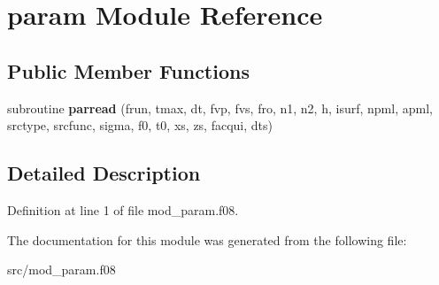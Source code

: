 \hypertarget{classparam}{\section{param Module Reference}
\label{classparam}
}
\subsection*{Public Member Functions}
\begin{DoxyCompactItemize}
\item 
\hypertarget{classparam_ac823e02ac20d77652a28776568600139}{subroutine {\bfseries parread} (frun, tmax, dt, fvp, fvs, fro, n1, n2, h, isurf, npml, apml, srctype, srcfunc, sigma, f0, t0, xs, zs, facqui, dts)}\label{classparam_ac823e02ac20d77652a28776568600139}

\end{DoxyCompactItemize}


\subsection{Detailed Description}


Definition at line 1 of file mod\-\_\-param.\-f08.



The documentation for this module was generated from the following file\-:\begin{DoxyCompactItemize}
\item 
src/mod\-\_\-param.\-f08\end{DoxyCompactItemize}
